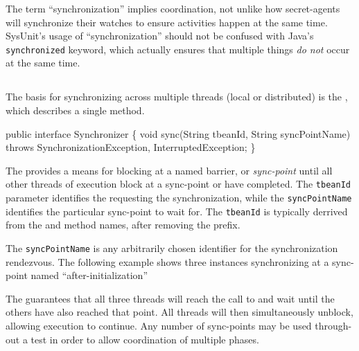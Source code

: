 \begin{note}
The term ``synchronization'' implies coordination, not unlike
how secret-agents will synchronize their watches to ensure 
activities happen at the same time.  SysUnit's usage of
``synchronization'' should not be confused with Java's
\texttt{synchronized} keyword, which actually ensures that
multiple things \emph{do not} occur at the same time.
\end{note}

\subsection{}

The basis for synchronizing across multiple threads (local or
distributed) is the , which describes a single
 method.  

\begin{codelisting}
public interface Synchronizer 
\{
    void sync(String tbeanId,
              String syncPointName)
        throws SynchronizationException, InterruptedException;
\}
\end{codelisting}

The  provides a means for blocking at a named
barrier, or \emph{sync-point} until all other threads of execution 
block at a sync-point or have completed.  The \texttt{tbeanId}
parameter identifies the  requesting the synchronization,
while the \texttt{syncPointName} identifies the particular sync-point
to wait for.  The \texttt{tbeanId} is typically derrived from the
 and  method names, after
removing the prefix.

The \texttt{syncPointName} is any arbitrarily chosen identifier
for the synchronization rendezvous.  The following example shows
three  instances synchronizing at a sync-point
named ``after-initialization''


The  guarantees that all three threads will
reach the call to  and wait until the others
have also reached that point.  All threads will then simultaneously
unblock, allowing execution to continue.
Any number of sync-points may be used through-out a test in order
to allow coordination of multiple phases.

